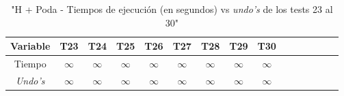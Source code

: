 \documentclass[12pt]{article}
\begin{document}
\begin{center}
\begin{table}[h]
        \caption{"H + Poda - Tiempos de ejecución (en segundos) vs \textit{undo's} de los tests 23 al 30"}
        \centering
        \begin{tabular} {| c | c | c | c | c | c | c | c | c | c | c | c | c | c | c |}
            \hline
            Variable & T23 & T24 & T25 & T26 & T27 & T28 & T29 & T30 \\
            \hline
            Tiempo & $\infty$ & $\infty$ & $\infty$ & $\infty$ & $\infty$ & $\infty$ & $\infty$ & $\infty$ \\
            \textit{Undo's} & $\infty$ & $\infty$ & $\infty$ & $\infty$ & $\infty$ & $\infty$ & $\infty$ & $\infty$ \\
            \hline
        \end{tabular}
    \end{table}
\end{center}
\end{document}

